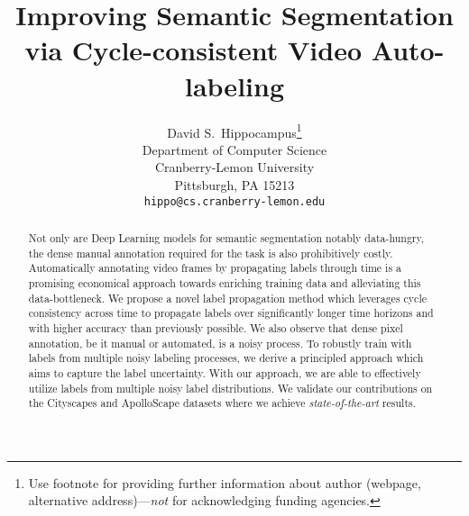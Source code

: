\documentclass{article}
\title{Improving Semantic Segmentation via Cycle-consistent Video Auto-labeling}
\author{%
  David S.~Hippocampus\thanks{Use footnote for providing further information
    about author (webpage, alternative address)---\emph{not} for acknowledging
    funding agencies.} \\
  Department of Computer Science\\
  Cranberry-Lemon University\\
  Pittsburgh, PA 15213 \\
  \texttt{hippo@cs.cranberry-lemon.edu} \\
}
\begin{document}
\maketitle

\begin{abstract}
Not only are Deep Learning models for semantic segmentation notably data-hungry, the dense manual annotation required for the task is also prohibitively costly. Automatically annotating video frames by propagating labels through time is a promising economical approach towards enriching training data and alleviating this data-bottleneck. We propose a novel label propagation method which leverages cycle consistency across time to propagate labels over significantly longer time horizons and with higher accuracy than previously possible. We also observe that dense pixel annotation, be it manual or automated, is a noisy process. To robustly train with labels from multiple noisy labeling processes, we derive a principled approach which aims to capture the label uncertainty. With our approach, we are able to effectively utilize labels from multiple noisy label distributions. We validate our contributions on the Cityscapes and ApolloScape datasets where we achieve \textit{state-of-the-art} results.


% 




\end{abstract}
\end{document}
